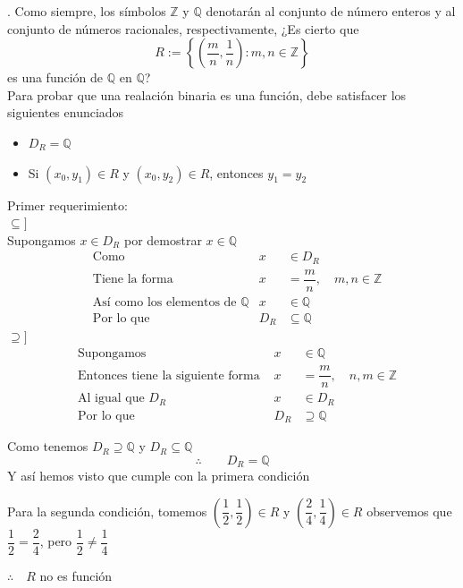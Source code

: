 \documentclass[letterpaper]{article}
\newcommand{\Q}{\mathds{Q}}
\newcommand{\Z}{\mathds{Z}}
\renewcommand{\*}{\cdot}
\theoremstyle{definition}
\begin{document}
. Como siempre, los símbolos $ \Z $ y $ \Q $ denotarán al conjunto de número enteros y al conjunto de números racionales, respectivamente, ¿Es cierto que 
\[ R:= \left\lbrace \left(\dfrac{m}{n}, \dfrac{1}{n}\right): m, n \in \Z \right\rbrace \]
es una función de $ \Q $ en $ \Q $?\\
Para probar que una realación binaria es una función, debe satisfacer los siguientes enunciados
\begin{itemize}
	\item $ D_R = \Q $
	\item Si $ (x_0, y_1) \in R $ y $ (x_0, y_2) \in R $, entonces $ y_1 = y_2 $
\end{itemize}
Primer requerimiento: \\
$ \subseteq] $ \\
Supongamos $ x \in D_R $ por demostrar $ x \in \Q $
\begin{align*}
	& \text{Como } & x &\in D_R\\
	& \text{Tiene la forma } & x &= \dfrac{m}{n}, \quad m, n \in \Z\\
	& \text{Así como los elementos de  }\Q & x&\in \Q\\
	& \text{Por lo que  } & D_R &\subseteq \Q
\end{align*}
$ \supseteq] $
\begin{align*}
	& \text{Supongamos } & x &\in \Q\\
	& \text{Entonces tiene la siguiente forma } & x &= \dfrac{m}{n}, \quad n, m \in \Z \\
	& \text{Al igual que } D_R & x &\in D_R\\
	& \text{Por lo que  } &  D_R &\supseteq \Q
\end{align*}
\begin{center}
	Como tenemos $ D_R \supseteq \Q  $ y $ D_R \subseteq \Q  $
	\[ \therefore \qquad D_R = \Q  \]
	Y así hemos visto que cumple con la primera condición
\end{center}
Para la segunda condición, tomemos $ \left( \dfrac{1}{2}, \dfrac{1}{2} \right) \in R $ y $ \left( \dfrac{2}{4}, \dfrac{1}{4} \right) \in R $
observemos que $ \dfrac{1}{2} = \dfrac{2}{4} $, pero $ \dfrac{1}{2} \neq \dfrac{1}{4}  $
\begin{center}
	$ \therefore \quad R $ no es función
\end{center}
\end{document}
